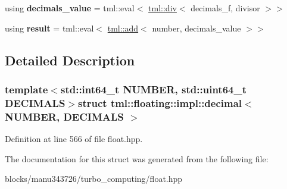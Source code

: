 \begin{DoxyCompactItemize}
\item 
\hypertarget{structtml_1_1floating_1_1impl_1_1decimal_ab870e1dbdd306bdb31365395ff435c97}{using {\bfseries decimals\+\_\+value} = tml\+::eval$<$ \hyperlink{structtml_1_1div}{tml\+::div}$<$ decimals\+\_\+f, divisor $>$$>$}\label{structtml_1_1floating_1_1impl_1_1decimal_ab870e1dbdd306bdb31365395ff435c97}

\item 
\hypertarget{structtml_1_1floating_1_1impl_1_1decimal_a19fcb26551cba54b91351e003259e19f}{using {\bfseries result} = tml\+::eval$<$ \hyperlink{structtml_1_1add}{tml\+::add}$<$ number, decimals\+\_\+value $>$$>$}\label{structtml_1_1floating_1_1impl_1_1decimal_a19fcb26551cba54b91351e003259e19f}

\end{DoxyCompactItemize}


\subsection{Detailed Description}
\subsubsection*{template$<$std\+::int64\+\_\+t N\+U\+M\+B\+E\+R, std\+::uint64\+\_\+t D\+E\+C\+I\+M\+A\+L\+S$>$struct tml\+::floating\+::impl\+::decimal$<$ N\+U\+M\+B\+E\+R, D\+E\+C\+I\+M\+A\+L\+S $>$}



Definition at line 566 of file float.\+hpp.



The documentation for this struct was generated from the following file\+:\begin{DoxyCompactItemize}
\item 
blocks/manu343726/turbo\+\_\+computing/float.\+hpp\end{DoxyCompactItemize}

